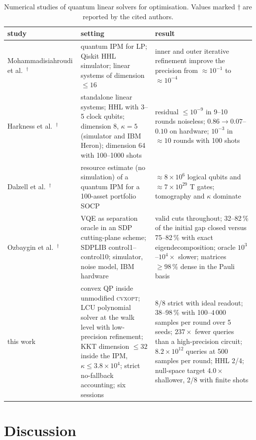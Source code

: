 \documentclass[11pt]{article}
\theoremstyle{definition}
\newcommand{\dsus}{\textunderscore\penalty5000\hskip0pt\relax}
\newcommand{\ds}[1]{{\ttfamily\let\_\dsus#1}}
\begin{document}
\begin{table}[t]\centering\small
\caption{Numerical studies of quantum linear solvers for optimisation. Values marked $\dagger$ are reported by the cited authors.}\label{tab:lit}
\begin{tabularx}{\textwidth}{p{3.5cm}XX}\toprule
study & setting & result\\\midrule
Mohammadisiahroudi et al.~\cite{mohammadisiahroudi2025improvements}$^\dagger$ & quantum IPM for LP; Qiskit HHL simulator; linear systems of dimension $\le16$ & inner and outer iterative refinement improve the precision from $\approx10^{-1}$ to $\approx10^{-4}$\\
Harkness et al.~\cite{harkness2026ir}$^\dagger$ & standalone linear systems; HHL with 3--5 clock qubits; dimension 8, $\kappa=5$ (simulator and IBM Heron); dimension 64 with 100--1000 shots & residual $\le10^{-9}$ in 9--10 rounds noiseless; $0.86\to0.07$--$0.10$ on hardware; $10^{-3}$ in $\approx10$ rounds with 100 shots\\
Dalzell et al.~\cite{dalzell2023endtoend}$^\dagger$ & resource estimate (no simulation) of a quantum IPM for a 100-asset portfolio SOCP & $\approx8\times10^{6}$ logical qubits and $\approx7\times10^{29}$ T gates; tomography and $\kappa$ dominate\\
Ozbaygin et al.~\cite{ozbaygin2026vqe}$^\dagger$ & VQE as separation oracle in an SDP cutting-plane scheme; SDPLIB \ds{control1}--\ds{control10}; simulator, noise model, IBM hardware & valid cuts throughout; 32--82\,\% of the initial gap closed versus 75--82\,\% with exact eigendecomposition; oracle $10^{3}$--$10^{4}\times$ slower; matrices $\ge98\,\%$ dense in the Pauli basis\\
this work & convex QP inside unmodified \textsc{cvxopt}; LCU polynomial solver at the walk level with low-precision refinement; KKT dimension $\le32$ inside the IPM, $\kappa\le3.8\times10^{4}$; strict no-fallback accounting; six sessions & 8/8 strict with ideal readout; 38--98\,\% with 100--$4\,000$ samples per round over 5 seeds; $237\times$ fewer queries than a high-precision circuit; $8.2\times10^{12}$ queries at 500 samples per round; HHL 2/4; null-space target $4.0\times$ shallower, 2/8 with finite shots\\\bottomrule
\end{tabularx}
\end{table}

\section{Discussion}\label{sec:discussion}
\end{document}
